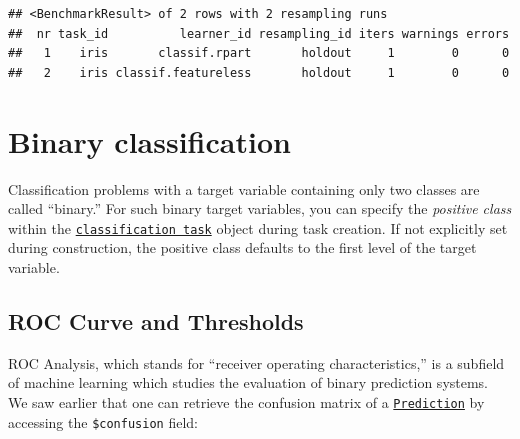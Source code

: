 \documentclass[
]{scrbook}
\newenvironment{Shaded}{\begin{snugshade}}{\end{snugshade}}
\newcommand{\AttributeTok}[1]{\textcolor[rgb]{0.77,0.63,0.00}{#1}}
\newcommand{\CommentTok}[1]{\textcolor[rgb]{0.56,0.35,0.01}{\textit{#1}}}
\newcommand{\FunctionTok}[1]{\textcolor[rgb]{0.00,0.00,0.00}{#1}}
\newcommand{\NormalTok}[1]{#1}
\newcommand{\OtherTok}[1]{\textcolor[rgb]{0.56,0.35,0.01}{#1}}
\newcommand{\SpecialCharTok}[1]{\textcolor[rgb]{0.00,0.00,0.00}{#1}}
\newcommand{\StringTok}[1]{\textcolor[rgb]{0.31,0.60,0.02}{#1}}
\renewenvironment{Shaded} {\begin{snugshade}\small} {\end{snugshade}}
\begin{document}
\begin{verbatim}
## <BenchmarkResult> of 2 rows with 2 resampling runs
##  nr task_id          learner_id resampling_id iters warnings errors
##   1    iris       classif.rpart       holdout     1        0      0
##   2    iris classif.featureless       holdout     1        0      0
\end{verbatim}

\hypertarget{binary-classification}{%
\section{Binary classification}\label{binary-classification}}

Classification problems with a target variable containing only two classes are called ``binary.''
For such binary target variables, you can specify the \emph{positive class} within the \href{https://mlr3.mlr-org.com/reference/TaskClassif.html}{\texttt{classification\ task}} object during task creation.
If not explicitly set during construction, the positive class defaults to the first level of the target variable.

\begin{Shaded}
\end{Shaded}

\hypertarget{binary-roc}{%
\subsection{ROC Curve and Thresholds}\label{binary-roc}}

ROC Analysis, which stands for ``receiver operating characteristics,'' is a subfield of machine learning which studies the evaluation of binary prediction systems.
We saw earlier that one can retrieve the confusion matrix of a \href{https://mlr3.mlr-org.com/reference/Prediction.html}{\texttt{Prediction}} by accessing the \texttt{\$confusion} field:
\end{document}
